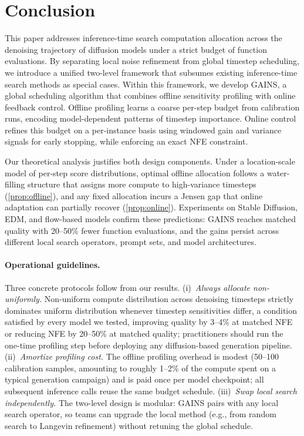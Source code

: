 \section{Conclusion}
\label{sec:conclusion}

This paper addresses inference-time search computation allocation across
the denoising trajectory of diffusion models under a strict budget of function
evaluations.
By separating local noise refinement from global timestep scheduling, we
introduce a unified two-level framework that subsumes existing inference-time
search methods as special cases.
Within this framework, we develop GAINS, a global scheduling algorithm that
combines offline sensitivity profiling with online feedback control.
Offline profiling learns a coarse per-step budget from calibration
runs, encoding model-dependent patterns of timestep importance.
Online control refines this budget on a per-instance basis using windowed
gain and variance signals for early stopping, while enforcing an exact NFE
constraint.

Our theoretical analysis justifies both design components.
Under a location-scale model of per-step score distributions, optimal offline
allocation follows a water-filling structure that assigns more
compute to high-variance timesteps (\cref{prop:offline}), and any fixed
allocation incurs a Jensen gap that online adaptation can partially recover
(\cref{prop:online}).
Experiments on Stable Diffusion, EDM, and flow-based models confirm
these predictions: GAINS reaches matched quality with 20--50\% fewer
function evaluations, and the gains persist
across different local search operators, prompt sets, and model architectures.

\paragraph{Operational guidelines.}
Three concrete protocols follow from our results.
(i)~\emph{Always allocate non-uniformly.}  Non-uniform compute distribution across
denoising timesteps strictly dominates uniform distribution whenever timestep
sensitivities differ, a condition satisfied by every model we tested,
improving quality by 3--4\% at matched NFE or reducing NFE by 20--50\% at matched quality;
practitioners should run the one-time profiling step before deploying any diffusion-based generation pipeline.
(ii)~\emph{Amortize profiling cost.}  The offline profiling overhead is modest (50--100 calibration samples, amounting to roughly 1--2\% of the compute spent on a typical generation campaign) and is paid once per model checkpoint;
all subsequent inference calls reuse the same budget schedule.
(iii)~\emph{Swap local search independently.}  The two-level design is modular:
GAINS pairs with any local search operator, so teams can upgrade the
local method (e.g., from random search to Langevin refinement) without
retuning the global schedule.

